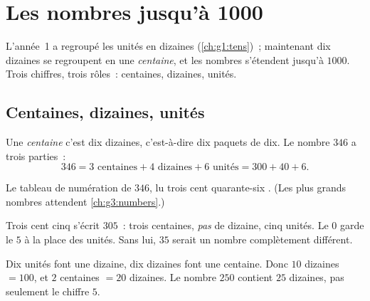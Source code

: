\chapter{Les nombres jusqu'à 1000}\label{ch:g2:numbers}

L'année~1 a regroupé les unités en dizaines
(\cref{ch:g1:tens})~; maintenant dix dizaines se regroupent en une
\emph{centaine}, et les nombres s'étendent jusqu'à $1000$. Trois
chiffres, trois rôles~: centaines, dizaines, unités.

\section{Centaines, dizaines, unités}

\begin{definition}\label{def:g2:numbers:places}
Une \emph{centaine} c'est dix dizaines, c'est-à-dire dix paquets de
dix. Le nombre $346$ a trois parties~:
\[
346 = 3 \text{ centaines} + 4 \text{ dizaines} + 6 \text{ unités}
= 300 + 40 + 6 .
\]
\end{definition}

\begin{omfigure}

{\small Le tableau de numération de $346$, lu
\guillemotleft{} trois cent quarante-six \guillemotright{}. (Les plus
grands nombres attendent \cref{ch:g3:numbers}.)}
\end{omfigure}

\begin{example}\label{ex:g2:numbers:zero}
\guillemotleft{} Trois cent cinq \guillemotright{} s'écrit $305$~:
trois centaines, \emph{pas} de dizaine, cinq unités. Le $0$ garde
le $5$ à la place des unités. Sans lui, $35$ serait un nombre
complètement différent.
\end{example}

\begin{example}[Échanges]\label{ex:g2:numbers:exchange}
Dix unités font une dizaine, dix dizaines font une centaine. Donc
$10$ dizaines $= 100$, et $2$ centaines $= 20$ dizaines. Le nombre
$250$ contient $25$ dizaines, pas seulement le chiffre $5$.
\end{example}

